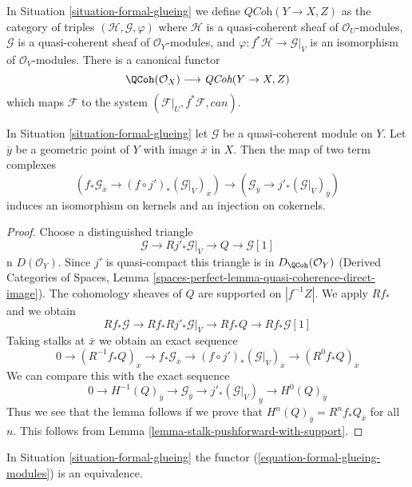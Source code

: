 \noindent
In Situation \ref{situation-formal-glueing} we define
$\textit{QCoh}(Y \to X, Z)$ as the category of
triples $(\mathcal{H}, \mathcal{G}, \varphi)$ where
$\mathcal{H}$ is a quasi-coherent sheaf of
$\mathcal{O}_U$-modules, $\mathcal{G}$ is a quasi-coherent sheaf
of $\mathcal{O}_Y$-modules, and
$\varphi : f^*\mathcal{H} \to \mathcal{G}|_V$ is an isomorphism
of $\mathcal{O}_V$-modules. There is a canonical
functor
\begin{equation}
\label{equation-formal-glueing-modules}
\QCoh(\mathcal{O}_X) \longrightarrow \textit{QCoh}(Y \to X, Z)
\end{equation}
which maps $\mathcal{F}$ to the system
$(\mathcal{F}|_U, f^*\mathcal{F}, can)$.


\begin{lemma}
\label{lemma-stalk-formal-glueing}
In Situation \ref{situation-formal-glueing} let $\mathcal{G}$
be a quasi-coherent module on $Y$. Let $\overline{y}$ be a
geometric point of $Y$ with image $\overline{x}$ in $X$.
Then the map of two term complexes
$$
\left(f_*\mathcal{G}_{\overline{x}} \to
(f \circ j')_*(\mathcal{G}|_V)_{\overline{x}}\right)
\longrightarrow
\left(\mathcal{G}_{\overline{y}} \to j'_*(\mathcal{G}|_V)_{\overline{y}}\right)
$$
induces an isomorphism on kernels and an injection on cokernels.
\end{lemma}

\begin{proof}
Choose a distinguished triangle
$$
\mathcal{G} \to Rj'_*\mathcal{G}|_V \to Q \to \mathcal{G}[1]
$$
n $D(\mathcal{O}_Y)$. Since $j'$ is quasi-compact this triangle is
in $D_\QCoh(\mathcal{O}_Y)$
(Derived Categories of Spaces, Lemma
\ref{spaces-perfect-lemma-quasi-coherence-direct-image}).
The cohomology sheaves of $Q$
are supported on $|f^{-1}Z|$. We apply $Rf_*$ and we obtain
$$
Rf_*\mathcal{G} \to Rf_*Rj'_*\mathcal{G}|_V \to Rf_*Q
\to Rf_*\mathcal{G}[1]
$$
Taking stalks at $\overline{x}$ we obtain an exact sequence
$$
0 \to
(R^{-1}f_*Q)_{\overline{x}} \to
f_*\mathcal{G}_{\overline{x}} \to
(f \circ j')_*(\mathcal{G}|_V)_{\overline{x}} \to
(R^0f_*Q)_{\overline{x}}
$$
We can compare this with the exact sequence
$$
0 \to
H^{-1}(Q)_{\overline{y}} \to
\mathcal{G}_{\overline{y}} \to
j'_*(\mathcal{G}|_V)_{\overline{y}} \to
H^0(Q)_{\overline{y}}
$$
Thus we see that the lemma follows if we prove that
$H^n(Q)_{\overline{y}} = R^nf_*Q_{\overline{x}}$ for all $n$.
This follows from Lemma \ref{lemma-stalk-pushforward-with-support}.
\end{proof}

\begin{proposition}
\label{proposition-formal-glueing-modules}
In Situation \ref{situation-formal-glueing} the functor
(\ref{equation-formal-glueing-modules}) is an equivalence.
\end{proposition}


